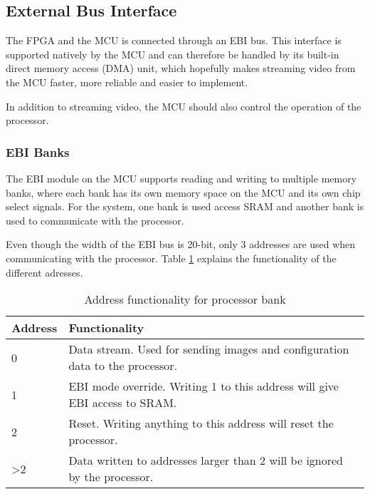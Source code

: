 \clearpage %
\subsection{External Bus Interface}
The FPGA and the MCU is connected through an EBI bus.
This interface is supported natively by the MCU and can therefore be handled by its built-in direct memory access (DMA) unit, which hopefully makes streaming video from the MCU faster, more reliable and easier to implement.

In addition to streaming video, the MCU should also control the operation of the processor.

\subsubsection{EBI Banks}
The EBI module on the MCU supports reading and writing to multiple memory banks, where each bank has its own memory space on the MCU and its own chip select signals. For the system, one bank is used access SRAM and another bank is used to communicate with the processor.

Even though the width of the EBI bus is 20-bit, only 3 addresses are used when communicating with the processor. Table \ref{ebi_processor_addresses} explains the functionality of the different adresses.

\begin{table}[h!]
\centering
	\begin{tabular}{ | l | p{10cm} |}
		\hline
		Address & Functionality \\ \hline
		0 & Data stream. Used for sending images and configuration data to the processor. \\ \hline
		1 & EBI mode override. Writing 1 to this address will give EBI access to SRAM. \\ \hline
		2 & Reset. Writing anything to this address will reset the processor. \\ \hline
		>2 & Data written to addresses larger than 2 will be ignored by the processor. \\ \hline
	\end{tabular}
	\caption{Address functionality for processor bank}
	\label{ebi_processor_addresses}
\end{table}


